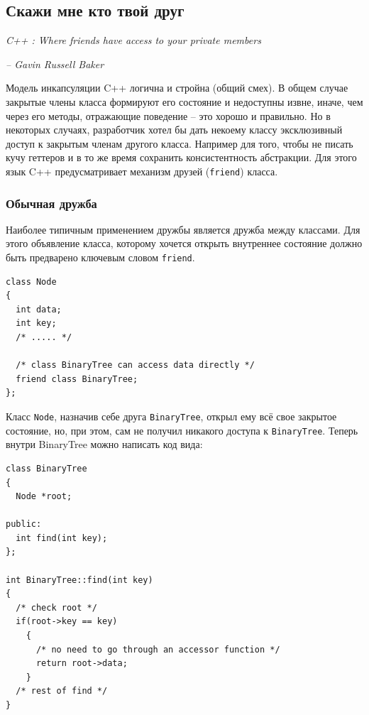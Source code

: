 \documentclass[a4paper,12pt,oneside]{article}
\begin{document}
\pagebreak
\subsection{Скажи мне кто твой друг}\label{WhosYourFriend}

\hfill\textit{C++ : Where friends have access to your private members}{\vspace{0.5em}}

\hfill\textit{-- Gavin Russell Baker}

Модель инкапсуляции C++ логична и стройна (общий смех). В общем случае закрытые члены класса формируют его состояние и недоступны извне, иначе, чем через его методы, отражающие поведение -- это хорошо и правильно. Но в некоторых случаях, разработчик хотел бы дать некоему классу эксклюзивный доступ к закрытым членам другого класса. Например для того, чтобы не писать кучу геттеров и в то же время сохранить консистентность абстракции. Для этого язык C++ предусматривает механизм друзей (\lstinline!friend!) класса.

\subsubsection{Обычная дружба}

Наиболее типичным применением дружбы является дружба между классами. Для этого объявление класса, которому хочется открыть внутреннее состояние должно быть предварено ключевым словом \lstinline!friend!.

\begin{lstlisting}
class Node
{
  int data;
  int key;
  /* ..... */

  /* class BinaryTree can access data directly */
  friend class BinaryTree; 
};
\end{lstlisting}


Класс \lstinline!Node!, назначив себе друга \lstinline!BinaryTree!, открыл ему всё свое закрытое состояние, но, при этом, сам не получил никакого доступа к \lstinline!BinaryTree!. Теперь внутри BinaryTree можно написать код вида:

\begin{lstlisting}
class BinaryTree
{
  Node *root;

public:
  int find(int key);
};

int BinaryTree::find(int key)
{
  /* check root */
  if(root->key == key)
    {
      /* no need to go through an accessor function */
      return root->data;
    }
  /* rest of find */
}
\end{lstlisting}
\end{document}
